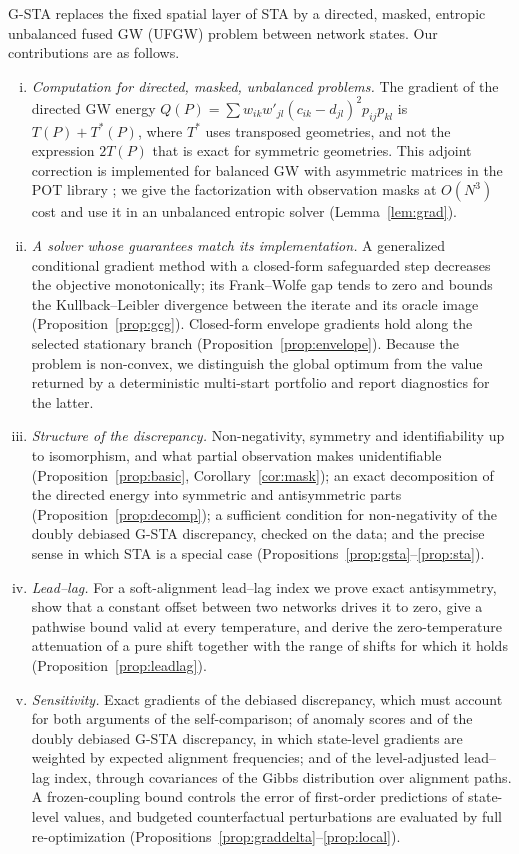\documentclass[12pt]{article}
\theoremstyle{definition}
\begin{document}
G-STA replaces the fixed spatial layer of STA by a directed, masked, entropic unbalanced fused GW (UFGW) problem between network states. Our contributions are as follows.

\begin{enumerate}[(i)]
\item \emph{Computation for directed, masked, unbalanced problems.} The gradient of the directed GW energy $Q(P)=\sum w_{ik}w'_{jl}(c_{ik}-d_{jl})^2p_{ij}p_{kl}$ is $T(P)+T^\ast(P)$, where $T^\ast$ uses transposed geometries, and not the expression $2T(P)$ that is exact for symmetric geometries. This adjoint correction is implemented for balanced GW with asymmetric matrices in the POT library \citep{flamary2021pot}; we give the factorization with observation masks at $O(N^3)$ cost and use it in an unbalanced entropic solver (Lemma~\ref{lem:grad}).
\item \emph{A solver whose guarantees match its implementation.} A generalized conditional gradient method with a closed-form safeguarded step decreases the objective monotonically; its Frank--Wolfe gap tends to zero and bounds the Kullback--Leibler divergence between the iterate and its oracle image (Proposition~\ref{prop:gcg}). Closed-form envelope gradients hold along the selected stationary branch (Proposition~\ref{prop:envelope}). Because the problem is non-convex, we distinguish the global optimum from the value returned by a deterministic multi-start portfolio and report diagnostics for the latter.
\item \emph{Structure of the discrepancy.} Non-negativity, symmetry and identifiability up to isomorphism, and what partial observation makes unidentifiable (Proposition~\ref{prop:basic}, Corollary~\ref{cor:mask}); an exact decomposition of the directed energy into symmetric and antisymmetric parts (Proposition~\ref{prop:decomp}); a sufficient condition for non-negativity of the doubly debiased G-STA discrepancy, checked on the data; and the precise sense in which STA is a special case (Propositions~\ref{prop:gsta}--\ref{prop:sta}).
\item \emph{Lead--lag.} For a soft-alignment lead--lag index we prove exact antisymmetry, show that a constant offset between two networks drives it to zero, give a pathwise bound valid at every temperature, and derive the zero-temperature attenuation of a pure shift together with the range of shifts for which it holds (Proposition~\ref{prop:leadlag}).
\item \emph{Sensitivity.} Exact gradients of the debiased discrepancy, which must account for both arguments of the self-comparison; of anomaly scores and of the doubly debiased G-STA discrepancy, in which state-level gradients are weighted by expected alignment frequencies; and of the level-adjusted lead--lag index, through covariances of the Gibbs distribution over alignment paths. A frozen-coupling bound controls the error of first-order predictions of state-level values, and budgeted counterfactual perturbations are evaluated by full re-optimization (Propositions~\ref{prop:graddelta}--\ref{prop:local}).

\end{enumerate}
\end{document}
